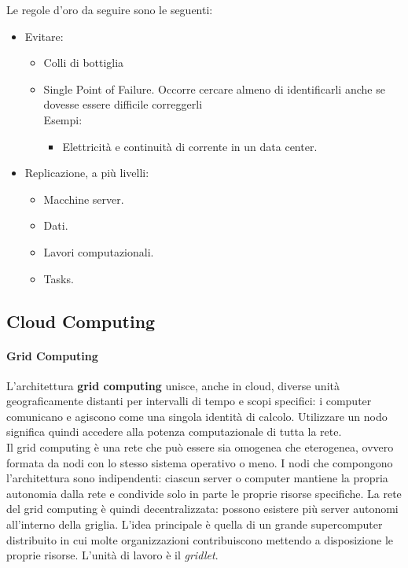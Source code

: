 \documentclass{article}
\begin{document}
		Le regole d'oro da seguire sono le seguenti:
		\begin{itemize}
		    \item Evitare:
		    \begin{itemize}
		        \item Colli di bottiglia
		        \item Single Point of Failure. Occorre cercare almeno di identificarli anche se dovesse essere difficile correggerli\\
		        Esempi:
		        \begin{itemize}
		            \item Elettricità e continuità di corrente in un data center.
		        \end{itemize}
		    \end{itemize}
		    \item Replicazione, a più livelli:
		    \begin{itemize}
		        \item Macchine server.
		        \item Dati.
		        \item Lavori computazionali.
		        \item Tasks.
		    \end{itemize}
		\end{itemize}
		
		\subsection{Cloud Computing}
		\paragraph{Grid Computing}
		L’architettura \textbf{grid computing} unisce, anche in cloud, diverse unità geograficamente distanti per intervalli di tempo e scopi specifici: i computer comunicano e agiscono come una singola identità di calcolo. Utilizzare un nodo significa quindi accedere alla potenza computazionale di tutta la rete.\\
		Il grid computing è una rete che può essere sia omogenea che eterogenea, ovvero formata da nodi con lo stesso sistema operativo o meno. I nodi che compongono l’architettura sono indipendenti: ciascun server o computer mantiene la propria autonomia dalla rete e condivide solo in parte le proprie risorse specifiche. La rete del grid computing è quindi decentralizzata: possono esistere più server autonomi all’interno della griglia.
		L'idea principale è quella di un grande supercomputer distribuito in cui molte organizzazioni contribuiscono mettendo a disposizione le proprie risorse. L'unità di lavoro è il \emph{gridlet}.
		
\end{document}
